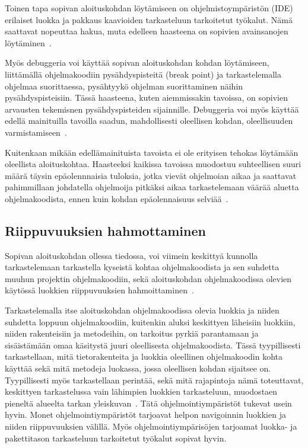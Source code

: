 \documentclass[finnish]{../tktltiki2}
\theoremstyle{definition}
\theoremstyle{remark}
\begin{document}
Toinen tapa sopivan aloituskohdan löytämiseen on ohjelmistoympäristön (IDE) erilaiset luokka ja pakkaus kaavioiden tarkasteluun tarkoitetut työkalut. Nämä saattavat nopeuttaa hakua, muta edelleen haasteena on sopivien avainsanojen löytäminen~\cite{what-to-search-for}.

Myös debuggeria voi käyttää sopivan aloituskohdan kohdan löytämiseen, liittämällä ohjelmakoodiin pysähdyspisteitä (break point) ja tarkastelemalla ohjelmaa suorittaessa, pysähtyykö ohjelman suorittaminen näihin pysähdyspisteisiin. Tässä haasteena, kuten aiemmissakin tavoissa, on sopivien arvausten tekemisnen pysähdyspisteiden sijainnille.
Debuggeria voi myös käyttää edellä mainituilla tavoilla saadun, mahdollisesti oleellisen kohdan, oleellisuuden varmistamiseen~\cite{eliciting-design-requirements-for-maintenance-oriented-ides}.

Kuitenkaan mikään edellämainituista tavoista ei ole erityisen tehokas löytämään oleellista aloituskohtaa. Haasteeksi kaikissa tavoissa muodostuu suhteellisen suuri määrä täysin epäolennnaisia tuloksia, jotka vievät ohjelmoian aikaa ja saattavat pahimmillaan johdatella ohjelmoija pitkäksi aikaa tarkastelemaan väärää aluetta ohjelmakoodista, ennen kuin kohdan epäolennaisuus selviää~\cite{eliciting-design-requirements-for-maintenance-oriented-ides}.

\subsection{Riippuvuuksien hahmottaminen}
Sopivan aloituskohdan ollessa tiedossa, voi viimein keskittyä kunnolla tarkastelemaan tarkastella kyseistä kohtaa ohjelmakoodista ja sen suhdetta muuhun projektin ohjelmakoodiin, sekä aloituskohdan ohjelmakoodissa olevien käytössä luokkien riippuvuuksien hahmoittaminen~\cite{questions-during-software-evolution-tasks}. %

Tarkastelemalla itse aloituskohdan ohjelmakoodissa olevia luokkia ja niiden suhdetta loppuun ohjelmakoodiin, kuitenkin aluksi keskittyen läheisiin luokkiin, niiden rakenteisiin ja metodeihin, on tarkoitus pyrkiä parantamaan ja sisäistämään omaa käsitystä juuri oleellisesta ohjelmakoodista. Tässä tyypillisesti tarkastellaan, mitä tietorakenteita ja luokkia oleellinen ohjelmakoodin kohta käyttää sekä mitä metodeja luokassa, jossa oleellisen kohdan sijaitsee on. Tyypillisesti myös tarkastellaan perintää, sekä mitä rajapintoja nämä toteuttavat, keskittyen tarkastelussa vain lähimpien luokkien tarkasteluun, muodostaen pieneltä alueelta tarkan yleiskuvan~\cite{questions-during-software-evolution-tasks}.
Tätä ohjelmointiympäristöt tukevat usein hyvin. Monet ohjelmointiympäristöt tarjoavat helpon navigoinnin luokkien ja niiden riippuvuuksien välillä. Myös ohjelmointiympärisöjen tarjoamat luokka- ja pakettitason tarkasteluun tarkoitetut työkalut sopivat hyvin.
\end{document}
